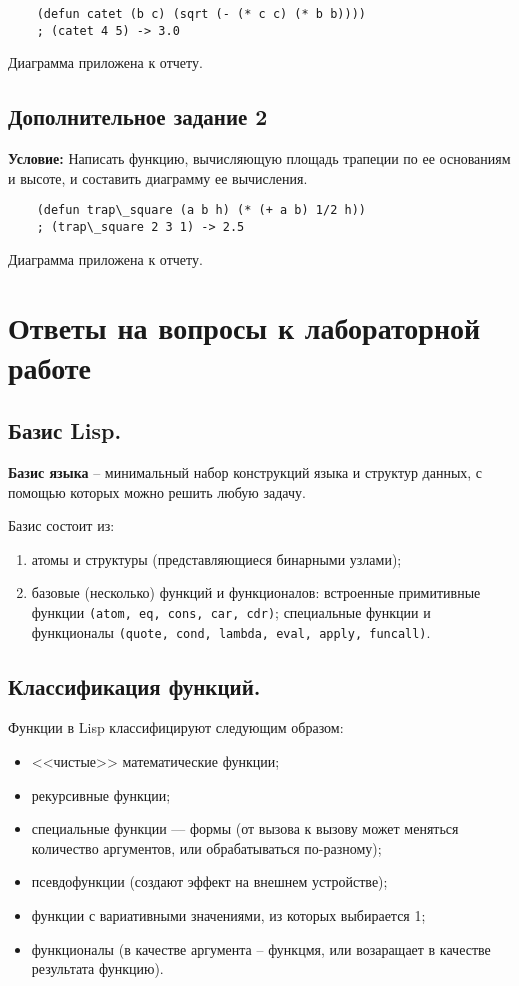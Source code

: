 \begin{lstlisting}
	(defun catet (b c) (sqrt (- (* c c) (* b b))))
	; (catet 4 5) -> 3.0
\end{lstlisting}

Диаграмма приложена к отчету.


\section{Дополнительное задание 2}

\textbf{Условие:} Написать функцию, вычисляющую площадь трапеции по ее основаниям и высоте, и составить диаграмму ее вычисления.

\begin{lstlisting}
	(defun trap\_square (a b h) (* (+ a b) 1/2 h))
	; (trap\_square 2 3 1) -> 2.5
\end{lstlisting}

Диаграмма приложена к отчету.




\chapter{Ответы на вопросы к лабораторной работе}

\section{Базис Lisp.}

\textbf{Базис языка} -- минимальный набор конструкций языка и структур данных, с помощью которых можно решить любую задачу.

Базис состоит из:
\begin{enumerate}
    \item атомы и структуры (представляющиеся бинарными узлами);
    \item базовые (несколько) функций и функционалов: встроенные примитивные функции \texttt{(atom, eq, cons, car, cdr)}; специальные функции и функционалы \texttt{(quote, cond, lambda, eval, apply, funcall)}.
\end{enumerate}


\section{Классификация функций.}

Функции в Lisp классифицируют следующим образом:

\begin{itemize}
    \item <<чистые>> математические функции;
    \item рекурсивные функции;
    \item специальные функции --- формы (от вызова к вызову может меняться количество аргументов, или обрабатываться по-разному);
    \item псевдофункции (создают эффект на внешнем устройстве);
    \item функции с вариативными значениями, из которых выбирается 1;
    \item функционалы (в качестве аргумента -- функцмя, или возаращает в качестве результата функцию).
\end{itemize}

